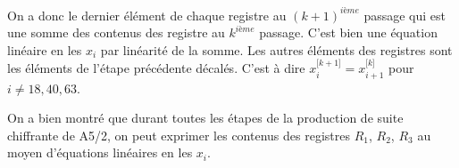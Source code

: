 On a donc le dernier élément de chaque registre au $(k+1)^{ième}$ passage qui est une somme des contenus des registre au $k^{ième}$ passage.
C'est bien une équation linéaire en les $x_i$ par linéarité de la somme.
Les autres éléments des registres sont les éléments de l'étape précédente décalés. C'est à dire $x^{\lbrack k+1\rbrack}_{i} = x^{\lbrack k\rbrack}_{i+1}$ pour $ i \neq 18, 40, 63$.

On a bien montré que durant toutes les étapes de la production de suite chiffrante de A5/2, on peut exprimer les contenus des registres $R_1$, $R_2$, $R_3$ au moyen d'équations linéaires en les $x_i$. 
